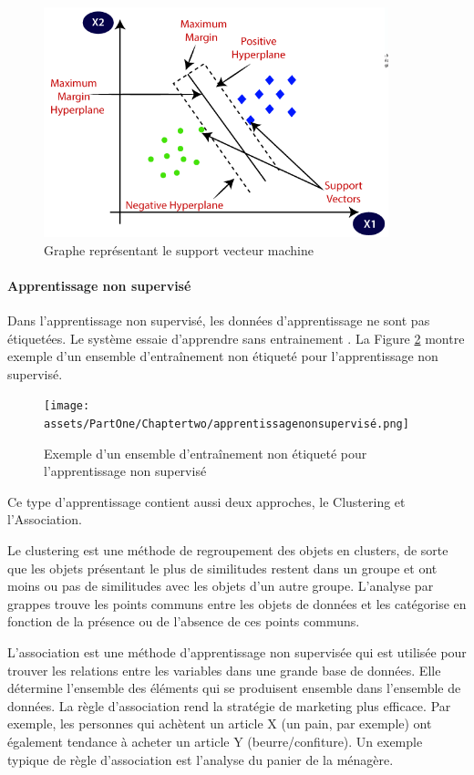 \begin{figure}[h]
    \centering
    \includegraphics[width=10cm]{assets/PartOne/Chaptertwo/supportvectormachine.png}
    \caption{Graphe représentant le support vecteur machine}
    \label{supportvectormachine}
    \end{figure}

    \newpage

\paragraph{Apprentissage non supervisé}
Dans l'apprentissage non supervisé, les données d'apprentissage ne sont pas étiquetées. Le système essaie d'apprendre sans entrainement \cite{aggarwalNeuralNetworksDeep2018}. La Figure \ref{apprentissagenonsupervisé} montre exemple d’un ensemble d'entraînement non étiqueté pour l’apprentissage non supervisé.

\begin{figure}[h]
    \centering
    \texttt{[image: assets/PartOne/Chaptertwo/apprentissagenonsupervisé.png]}
    \caption{Exemple d’un ensemble d'entraînement non étiqueté pour l’apprentissage non supervisé}
    \label{apprentissagenonsupervisé}
    \end{figure}

Ce type d’apprentissage contient aussi deux approches, le Clustering et l’Association. 

Le clustering est une méthode de regroupement des objets en clusters, de sorte que les objets présentant le plus de similitudes restent dans un groupe et ont moins ou pas de similitudes avec les objets d'un autre groupe. L'analyse par grappes trouve les points communs entre les objets de données et les catégorise en fonction de la présence ou de l'absence de ces points communs.

L’association est une méthode d'apprentissage non supervisée qui est utilisée pour trouver les relations entre les variables dans une grande base de données. Elle détermine l'ensemble des éléments qui se produisent ensemble dans l'ensemble de données. La règle d'association rend la stratégie de marketing plus efficace. Par exemple, les personnes qui achètent un article X (un pain, par exemple) ont également tendance à acheter un article Y (beurre/confiture). Un exemple typique de règle d'association est l'analyse du panier de la ménagère.

